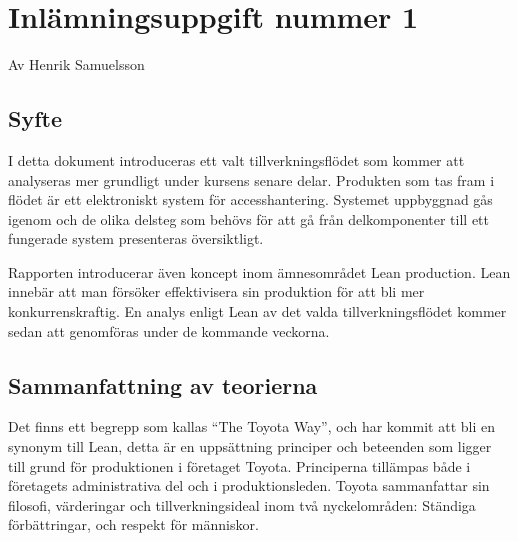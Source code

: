 \documentclass{article}
\begin{document}
\section*{Inlämningsuppgift nummer 1}
Av Henrik Samuelsson
\subsection*{Syfte}
I detta dokument introduceras ett valt tillverkningsflödet som kommer att analyseras mer grundligt under kursens senare delar. Produkten som tas fram i flödet är  ett elektroniskt system för accesshantering. Systemet uppbyggnad gås igenom och de olika delsteg som behövs för att gå från delkomponenter till ett fungerade system presenteras översiktligt.

Rapporten introducerar även koncept inom ämnesområdet Lean production. Lean innebär att man försöker effektivisera sin produktion för att bli mer konkurrenskraftig. En analys enligt Lean av det valda tillverkningsflödet kommer sedan att genomföras under de kommande veckorna.

\subsection*{Sammanfattning av teorierna}
Det finns ett begrepp som kallas ``The Toyota Way'', och har kommit att bli en synonym till Lean, detta är en uppsättning principer och beteenden som ligger till grund för produktionen i företaget Toyota. Principerna tillämpas både i företagets administrativa del och i produktionsleden. Toyota sammanfattar sin filosofi, värderingar och tillverkningsideal inom två nyckelområden: Ständiga förbättringar, och respekt för människor.
\end{document}
